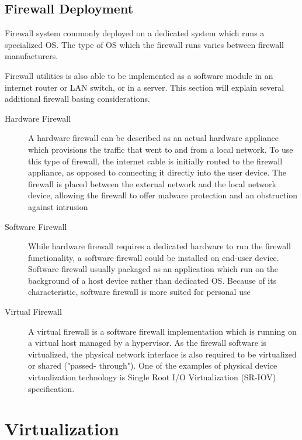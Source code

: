 \documentclass[../index.tex]{subfiles}
\begin{document}
\subsection{Firewall Deployment}

Firewall system commonly deployed on a dedicated system which runs a specialized OS. The type of OS
which the firewall runs varies between firewall manufacturers.

Firewall utilities is also able to be implemented as a software module in an internet router or LAN
switch, or in a server. This section will explain several additional firewall basing considerations.

\begin{description}

	\item[Hardware Firewall] A hardware firewall can be described as an actual hardware appliance
		which provisions the traffic that went to and from a local network. To use this type of
		firewall, the internet cable is initially routed to the firewall appliance, as opposed to
		connecting it directly into the user device. The firewall is placed between the external network
		and the local network device, allowing the firewall to offer malware protection and an
		obstruction against intrusion

	\item[Software Firewall] While hardware firewall requires a dedicated hardware to run the firewall
		functionality, a software firewall could be installed on end-user device. Software firewall
		usually packaged as an application which run on the background of a host device rather than
		dedicated OS. Because of its characteristic, software firewall is more suited for personal use

	\item[Virtual Firewall] A virtual firewall is a software firewall implementation which is running
		on a virtual host managed by a hypervisor. As the firewall software is virtualized, the physical
		network interface is also required to be virtualized or shared ("passed- through"). One of the
		examples of physical device virtualization technology is Single Root I/O Virtualization (SR-IOV)
		specification.

\end{description}

\section{Virtualization}
\end{document}
